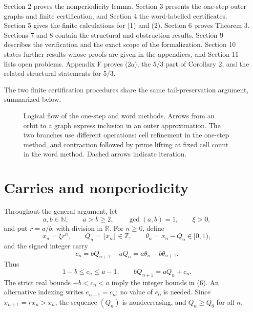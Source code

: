 \documentclass[11pt,reqno]{amsart}
\theoremstyle{definition}
\theoremstyle{remark}
\begin{document}
Section 2 proves the nonperiodicity lemma. Section 3 presents the one-step
outer graphs and finite certification, and Section 4 the word-labelled
certificates. Section 5 gives the finite calculations for (1) and (2).
Section 6 proves Theorem 3. Sections 7 and 8 contain the structural and
obstruction results. Section 9 describes the verification and the exact
scope of the formalization. Section 10 states further results whose proofs are given in the
appendices, and Section 11 lists open problems. Appendix F proves
(2a), the \(5/3\) part of Corollary 2, and the related structural
statements for \(5/3\).

The two finite certification procedures share the same tail-preservation argument, summarized below.

\begin{figure}[htbp]
\centering

\caption{Logical flow of the one-step and word methods. Arrows from an orbit to a graph express inclusion in an outer approximation. The two branches use different operations: cell refinement in the one-step method, and contraction followed by prime lifting at fixed cell count in the word method. Dashed arrows indicate iteration.}
\label{fig:certificate-flow}
\end{figure}

\section{Carries and nonperiodicity}\label{sec:2}

Throughout the general argument, let
\[
a,b\in\mathbb N,\qquad a>b\ge2,\qquad \gcd(a,b)=1,\qquad \xi>0,
\]
and put \(r=a/b\), with division in \(\mathbb R\). For \(n\ge0\), define
\[
x_n=\xi r^n,\qquad Q_n=\lfloor x_n\rfloor\in\mathbb Z,
\qquad \theta_n=x_n-Q_n\in[0,1),
\tag{4}\label{eq:4}
\]
and the signed integer carry
\[
c_n=bQ_{n+1}-aQ_n=a\theta_n-b\theta_{n+1}.
\tag{5}\label{eq:5}
\]
Thus
\[
1-b\le c_n\le a-1,\qquad bQ_{n+1}=aQ_n+c_n.
\tag{6}\label{eq:6}
\]
The strict real bounds \(-b<c_n<a\) imply the integer bounds in (6).
An alternative indexing writes \(e_{n+1}=c_n\); no value of \(e_0\) is
needed. Since \(x_{n+1}=rx_n>x_n\), the sequence \((Q_n)\) is
nondecreasing, and \(Q_n\ge Q_0\) for all \(n\).
\end{document}
